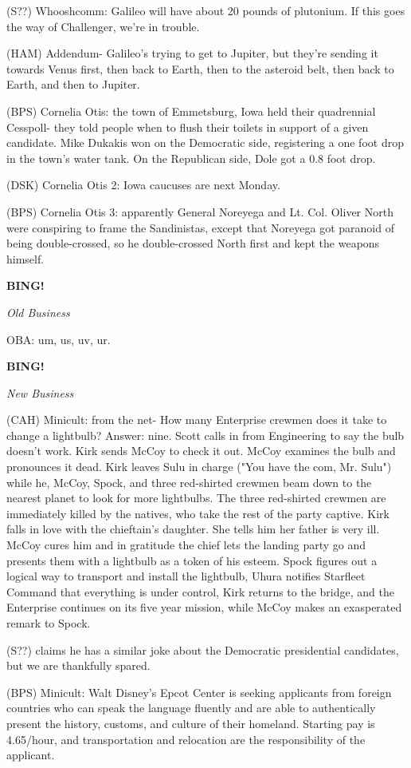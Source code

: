 \documentclass[12pt]{article}
\newcommand{\bing}{{\bf BING!} }
\newcommand{\goto}[1]{\bing \vskip 12pt \centerline{{\em{#1}}}}
\begin{document}
(S??) Whooshcomm: Galileo will have about 20 pounds of plutonium. If this goes the way of Challenger, we're in trouble.

(HAM) Addendum- Galileo's trying to get to Jupiter, but they're sending it towards Venus first, then back to Earth, then to the asteroid belt, then back to Earth, and then to Jupiter.

(BPS) Cornelia Otis: the town of Emmetsburg, Iowa held their quadrennial Cesspoll- they told people when to flush their toilets in support of a given candidate. Mike Dukakis won on the Democratic side, registering a one foot drop in the town's water tank. On the Republican side, Dole got a 0.8 foot drop.

(DSK) Cornelia Otis 2: Iowa caucuses are next Monday.

(BPS) Cornelia Otis 3: apparently General Noreyega and Lt. Col. Oliver North were conspiring to frame the Sandinistas, except that Noreyega got paranoid of being double-crossed, so he double-crossed North first and kept the weapons himself.

\goto{Old Business}

OBA: um, us, uv, ur.

\goto{New Business}

(CAH) Minicult: from the net- How many Enterprise crewmen does it take to change a lightbulb? Answer: nine. Scott calls in from Engineering to say the bulb doesn't work. Kirk sends McCoy to check it out. McCoy examines the bulb and pronounces it dead. Kirk leaves Sulu in charge ("You have the com, Mr. Sulu") while he, McCoy, Spock, and three red-shirted crewmen beam down to the nearest planet to look for more lightbulbs. The three red-shirted crewmen are immediately killed by the natives, who take the rest of the party captive. Kirk falls in love with the chieftain's daughter. She tells him her father is very ill. McCoy cures him and in gratitude the chief lets the landing party go and presents them with a lightbulb as a token of his esteem. Spock figures out a logical way to transport and install the lightbulb, Uhura notifies Starfleet Command that everything is under control, Kirk returns to the bridge, and the Enterprise continues on its five year mission, while McCoy makes an exasperated remark to Spock.

(S??) claims he has a similar joke about the Democratic presidential candidates, but we are thankfully spared.

(BPS) Minicult: Walt Disney's Epcot Center is seeking applicants from foreign countries who can speak the language fluently and are able to authentically present the history, customs, and culture of their homeland. Starting pay is 4.65/hour, and transportation and relocation are the responsibility of the applicant.
\end{document}
